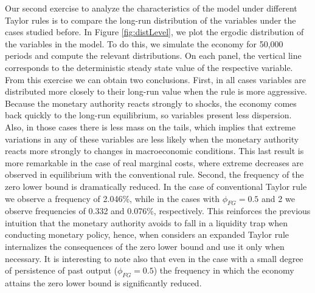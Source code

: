 \documentclass[11pt]{article}
\numberwithin{equation}{section}
\begin{document}
Our second exercise to analyze the characteristics of the model under different Taylor rules is to compare the long-run distribution of the variables under the cases studied before. In Figure \ref{fig:distLevel}, we plot the ergodic distribution of the variables in the model. To do this, we simulate the economy for 50,000 periods and compute the relevant distributions. On each panel, the vertical line corresponds to the deterministic steady state value of the respective variable. From this exercise we can obtain two conclusions. First, in all cases variables are distributed more closely to their long-run value when the rule is more aggressive. Because the monetary authority reacts strongly to shocks, the economy comes back quickly to the long-run equilibrium, so variables present less dispersion. Also, in those cases there is less mass on the tails, which implies that extreme variations in any of these variables are less likely when the monetary authority reacts more strongly to changes in macroeconomic conditions. This last result is more remarkable in the case of real marginal costs, where extreme decreases are observed in equilibrium with the conventional rule. Second, the frequency of the zero lower bound is dramatically reduced. In the case of conventional Taylor rule we observe a frequency of 2.046\%, while in the cases with $\phi_{FG}=0.5$ and 2 we observe frequencies of 0.332 and 0.076\%, respectively. This reinforces the previous intuition that the monetary authority avoids to fall in a liquidity trap when conducting monetary policy, hence, when considers an expanded Taylor rule internalizes the consequences of the zero lower bound and use it only when necessary. It is interesting to note also that even in the case with a small degree of persistence of past output ($\phi_{FG}=0.5$) the frequency in which the economy attains the zero lower bound is significantly reduced.
\end{document}
